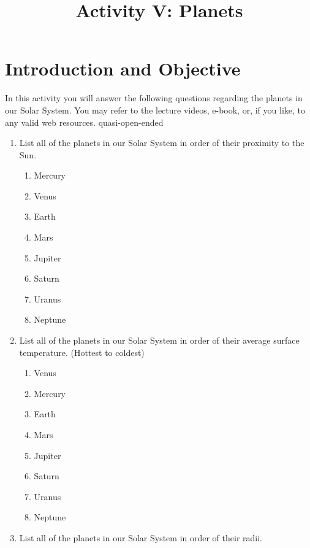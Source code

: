 \documentclass[12pt]{article}
\begin{document}
\title{Activity V: Planets}
\maketitle

\section{Introduction and Objective}

In this activity you will answer the following questions regarding the planets in our Solar System. You may refer to the lecture videos, e-book, or, if you like, to any valid web resources. quasi-open-ended

\begin{enumerate}
    \item List all of the planets in our Solar System in order of their proximity to the Sun.
        \begin{enumerate}
            \item Mercury
            \item Venus
            \item Earth
            \item Mars
            \item Jupiter
            \item Saturn
            \item Uranus
            \item Neptune
        \end{enumerate}
    \item List all of the planets in our Solar System in order of their average surface temperature.\newline\newline
        (Hottest to coldest)
        \begin{enumerate}
            \item Venus
            \item Mercury
            \item Earth
            \item Mars
            \item Jupiter
            \item Saturn
            \item Uranus
            \item Neptune
        \end{enumerate}
    \item List all of the planets in our Solar System in order of their radii.

\end{enumerate}
\end{document}
